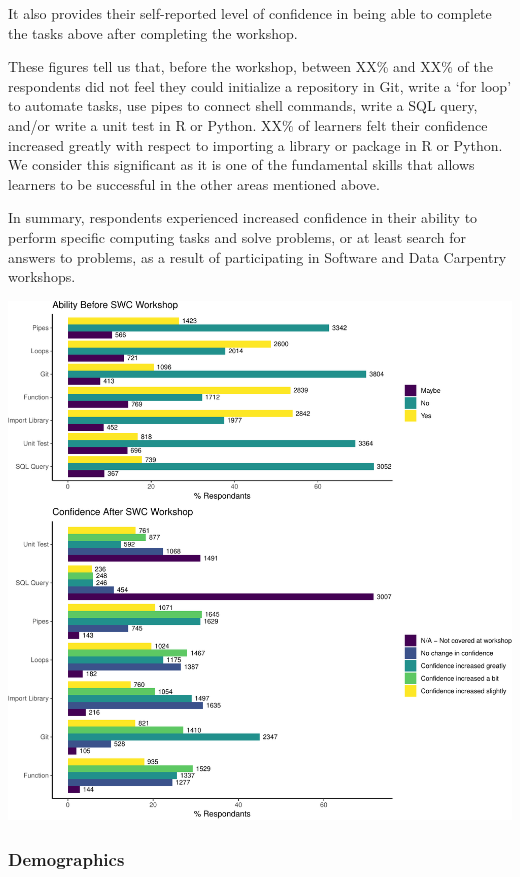 \documentclass[]{article}
\begin{document}
It also provides their self-reported level of confidence in being able
to complete the tasks above after completing the workshop.

These figures tell us that, before the workshop, between XX\% and XX\%
of the respondents did not feel they could initialize a repository in
Git, write a `for loop' to automate tasks, use pipes to connect shell
commands, write a SQL query, and/or write a unit test in R or Python.
XX\% of learners felt their confidence increased greatly with respect to
importing a library or package in R or Python. We consider this
significant as it is one of the fundamental skills that allows learners
to be successful in the other areas mentioned above.

In summary, respondents experienced increased confidence in their
ability to perform specific computing tasks and solve problems, or at
least search for answers to problems, as a result of participating in
Software and Data Carpentry workshops.

\includegraphics[width=720]{figures/swc-ability-confidence-1}

\subsubsection{Demographics}\label{demographics}
\end{document}
